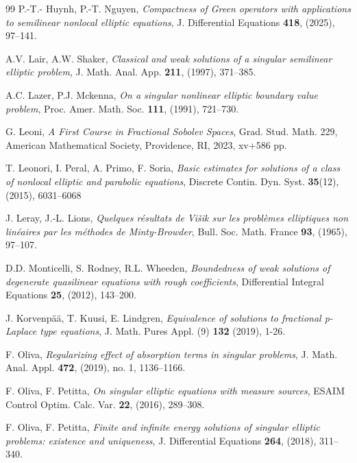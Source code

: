 \documentclass[11pt,a4paper]{amsart}
\theoremstyle{definition}
\theoremstyle{plain}
\numberwithin{equation}{section}
\begin{document}
{\begin{thebibliography}{99}
 P.-T.- Huynh, P.-T. Nguyen,
 {\em Compactness of Green operators with applications to semilinear nonlocal elliptic equations},
 J. Differential Equations {\bf 418}, (2025), 97--141.
 



A.V. Lair, A.W. Shaker,
{\em Classical and weak solutions of a singular semilinear elliptic problem},
J. Math. Anal. App. {\bf 211}, (1997), 371--385.

A.C. Lazer, P.J. Mckenna, 
{\em On a singular nonlinear elliptic boundary value problem}, 
Proc. Amer. Math. Soc. {\bf 111}, (1991), 721--730. 

G. Leoni,
\emph{A First Course in Fractional Sobolev Spaces}, 
Grad. Stud. Math. 229,
American Mathematical Society, Providence, RI, 2023, xv+586 pp.

T. Leonori, I. Peral, A. Primo, F. Soria, 
{\em Basic estimates for solutions of a class of nonlocal elliptic and parabolic equations},
Discrete Contin. Dyn. Syst. {\bf 35}(12), (2015), 6031--6068

J. Leray, J.-L. Lions, 
{\em Quelques r\'{e}sultats de Vi\v{s}ik sur les probl\`{e}mes elliptiques non lin\'{e}aires par les m\'{e}thodes de Minty-Browder}, 
Bull. Soc. Math. France {\bf 93}, (1965), 97--107.

D.D. Monticelli, S. Rodney, R.L. Wheeden,
\emph{Boundedness of weak solutions of degenerate quasilinear equations with rough coefficients},
Differential Integral Equations \textbf{25}, (2012), 143--200.

J. Korvenp\"a\"a, T. Kuusi, E. Lindgren,
\emph{Equivalence of solutions to fractional p-Laplace type equations},
 J. Math. Pures Appl. (9) \textbf{132} (2019), 1-26.

F. Oliva,
{\em Regularizing effect of absorption terms in singular problems},
J. Math. Anal. Appl. {\bf 472}, (2019), no. 1, 1136--1166.

F. Oliva, F. Petitta, 
{\em On singular elliptic equations with measure sources}, 
ESAIM Control Optim. Calc. Var. {\bf 22}, (2016), 289--308.

F. Oliva, F. Petitta,
{\em Finite and infinite energy solutions of singular elliptic problems: existence and uniqueness}, 
J. Differential Equations {\bf 264}, (2018), 311--340.


\end{thebibliography}}
\end{document}
